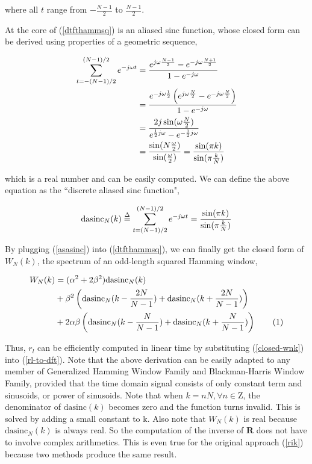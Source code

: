 \documentclass[dvips]{article}
\newcommand\numberthis{\addtocounter{equation}{1}\tag{\theequation}}
\newcommand{\matr}[1]{\mathbf{#1}}
\begin{document}
where all $t$ range from $-\frac{N - 1}{2}$ to $\frac{N - 1}{2}$.

At the core of (\ref{dtfthammsq}) is an aliased sinc function, whose closed form can be derived using properties of a geometric sequence\cite{smith},

\begin{align}
\sum_{t = -(N - 1) / 2}^{(N - 1) / 2} e^{-j\omega t} &= \frac{e^{j\omega \frac{N - 1}{2}} - e^{-j\omega \frac{N + 1}{2}}}{1 - e^{-j\omega}} \\
&= \frac{e^{-j\omega \frac{1}{2}} \left(e^{j\omega \frac{N}{2}} - e^{-j\omega \frac{N}{2}}\right)}{1 - e^{-j\omega}} \\
&= \frac{2j \sin(\omega \frac{N}{2})}{e^{\frac{1}{2}j\omega} - e^{-\frac{1}{2}j\omega}} \\
&= \frac{\sin(N \frac{\omega}{2})}{\sin(\frac{\omega}{2})}
 = \frac{\sin(\pi k)}{\sin(\pi \frac{k}{N})}
\end{align}

which is a real number and can be easily computed. We can define the above equation as the ``discrete aliased sinc function",

\newcommand{\dasinc}{\mathrm{dasinc}}
\begin{align} \label{asasinc}
\dasinc_N(k) \overset{\Delta}{=} \sum_{t = \nrng}^{\nrng} e^{-j\omega t} = \frac{\sin(\pi k)}{\sin(\pi \frac{k}{N})}
\end{align}

By plugging (\ref{asasinc}) into (\ref{dtfthammsq}), we can finally get the closed form of $W_N(k)$, the spectrum of an odd-length squared Hamming window,

\begin{align*}
W_N(k) &= (\alpha^2 + 2\beta^2) \dasinc_N(k) \\
       &+ \beta^2 \left(\dasinc_N(k - \frac{2N}{N - 1}) + \dasinc_N(k + \frac{2N}{N - 1})\right) \\
       &+ 2\alpha\beta \left(\dasinc_N(k - \frac{N}{N - 1}) + \dasinc_N(k + \frac{N}{N - 1})\right) \numberthis\label{closed-wnk}
\end{align*}

Thus, $r_l$ can be efficiently computed in linear time by substituting (\ref{closed-wnk}) into (\ref{rl-to-dft}). Note that the above derivation can be easily adapted to any member of Generalized Hamming Window Family and Blackman-Harris Window Family, provided that the time domain signal consists of only constant term and sinusoids, or power of sinusoids. Note that when $k = nN, \forall n \in \mathrm{Z}$, the denominator of $\dasinc(k)$ becomes zero and the function turns invalid. This is solved by adding a small constant to k. Also note that $W_N(k)$ is real because $\dasinc_N(k)$ is always real. So the computation of the inverse of $\matr{R}$ does not have to involve complex arithmetics. This is even true for the original approach (\ref{rik}) because two methods produce the same result.
\end{document}
